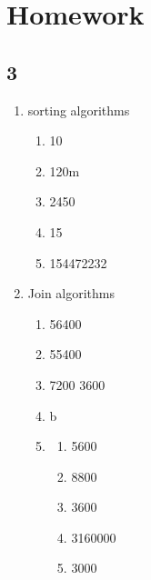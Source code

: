 \documentclass[11pt]{article}
\begin{document}
\section{Homework}
\label{sec:org9031fe7}
\subsection{3}
\label{sec:org3522c57}
\begin{enumerate}
\item sorting algorithms
\begin{enumerate}
\item 10
\item 120m
\item 2450
\item 15
\item 154472232
\end{enumerate}
\item Join algorithms
\begin{enumerate}
\item 56400
\item 55400
\item 7200 3600
\item b
\item \begin{enumerate}
\item 5600
\item 8800
\item 3600
\item 3160000
\item 3000
\end{enumerate}
\end{enumerate}
\end{enumerate}
\end{document}

